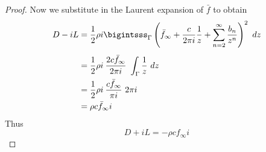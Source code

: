 \documentclass[letterpaper, twoside, 12 pt]{article}
\begin{document}
\begin{proof}
		Now we substitute in the Laurent expansion of $\bar f$ to obtain
		\begin{align*}
			D - iL &= \frac{1}{2} \rho i \bigintsss_\Gamma \left( \bar f_\infty + \frac{c}{2 \pi i} \frac{1}{z} + \sum_{n=2}^\infty \frac{b_n}{z^n} \right)^2 \ dz \\[1 ex]
			&= \frac{1}{2} \rho i \> \frac{2 c \bar f_\infty}{2 \pi i} \ \int_\Gamma \frac{1}{z} \ dz \\
			&= \frac{1}{2} \rho i \> \frac{c \bar f_\infty}{\pi i} \ 2 \pi i \\
			&= \rho c \bar f_\infty i
		\end{align*}
		Thus
		\[
			D + iL = - \rho c f_\infty i
		\]
	\end{proof}


\clearpage
\nocite{*}


\end{document}
